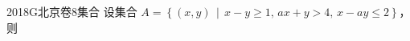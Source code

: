 
\begin{problem}{2018}{G}{北京卷}{8}{集合}
设集合 $ A = \left\{ (x,y) \,\middle|\, x - y \geqslant 1,\, ax + y > 4,\, x - ay \leqslant 2 \right\} $，则
\begin{choices}
\end{choices}
\end{problem}

\begin{answer}

\end{answer}

\begin{solutions}

\end{solutions}